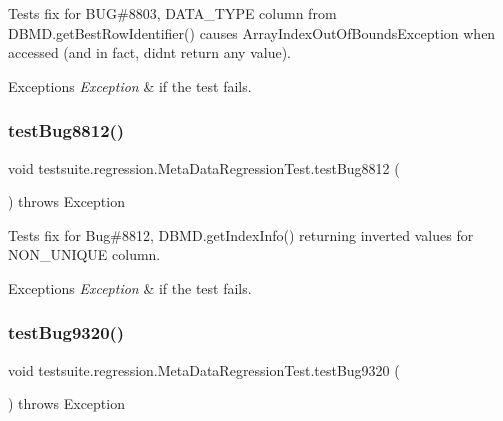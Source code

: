 Tests fix for B\+UG\#8803, \textquotesingle{}D\+A\+T\+A\+\_\+\+T\+Y\+PE\textquotesingle{} column from D\+B\+M\+D.\+get\+Best\+Row\+Identifier() causes Array\+Index\+Out\+Of\+Bounds\+Exception when accessed (and in fact, didn\textquotesingle{}t return any value).


\begin{DoxyExceptions}{Exceptions}
{\em Exception} & if the test fails. \\
\hline
\end{DoxyExceptions}
\mbox{\label{classtestsuite_1_1regression_1_1_meta_data_regression_test_a2e1523fa5764c3a574ab345132d80ccb}} 
\subsubsection{\texorpdfstring{test\+Bug8812()}{testBug8812()}}
{\footnotesize\ttfamily void testsuite.\+regression.\+Meta\+Data\+Regression\+Test.\+test\+Bug8812 (\begin{DoxyParamCaption}{ }\end{DoxyParamCaption}) throws Exception}

Tests fix for Bug\#8812, D\+B\+M\+D.\+get\+Index\+Info() returning inverted values for \textquotesingle{}N\+O\+N\+\_\+\+U\+N\+I\+Q\+UE\textquotesingle{} column.


\begin{DoxyExceptions}{Exceptions}
{\em Exception} & if the test fails. \\
\hline
\end{DoxyExceptions}
\mbox{\label{classtestsuite_1_1regression_1_1_meta_data_regression_test_a85b0332eeddf0448a8813e9e572be277}} 
\subsubsection{\texorpdfstring{test\+Bug9320()}{testBug9320()}}
{\footnotesize\ttfamily void testsuite.\+regression.\+Meta\+Data\+Regression\+Test.\+test\+Bug9320 (\begin{DoxyParamCaption}{ }\end{DoxyParamCaption}) throws Exception}

